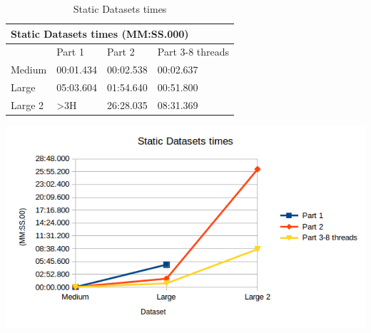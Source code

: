 \documentclass[11pt]{article}
\begin{document}
\begin{enumerate}
\begin{table}[H]
\caption{Static Datasets times}
\begin{minipage}{.5\textwidth}
\centering
\footnotesize
\tabcolsep=0.11cm
\label{sdt}
\begin{tabular}{|l|l|l|l|}
\hline
\multicolumn{4}{|l|}{Static Datasets times (MM:SS.000)} \\ \hline
        & Part 1         & Part 2    & Part 3-8 threads \\ \hline
Medium  & 00:01.434      & 00:02.538 & 00:02.637        \\ \hline
Large   & 05:03.604      & 01:54.640 & 00:51.800        \\ \hline
Large 2 & \textgreater3H & 26:28.035 & 08:31.369        \\ \hline
\end{tabular}
\end{minipage}%
\begin{minipage}{.5\textwidth}
\includegraphics[scale=0.5]{StaticDatasets_times.png}
\end{minipage}%
\end{table}


\end{enumerate}
\end{document}
